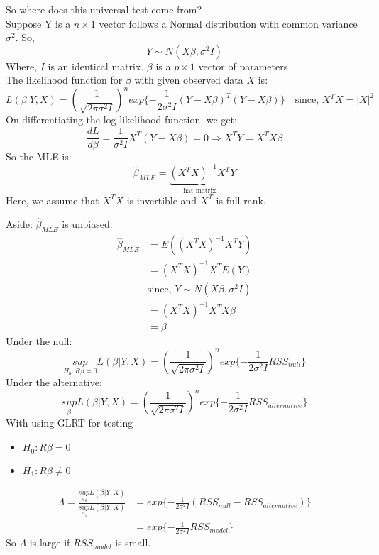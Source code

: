 \documentclass[12pt ]{article}
\begin{document}
So where does this universal test come from?\\
Suppose Y is a $n\times 1$ vector follows a Normal distribution with common variance $\sigma^2$. So,
\begin{equation*}
Y \sim N(X\beta, \sigma^2 I)
\end{equation*}
Where, $I$ is an identical matrix. $\beta$ is a $p\times 1$ vector of parameters\\
The likelihood function for $\beta$ with given observed data $X$ is:
\begin{equation*}
L(\beta|Y, X) = (\frac{1}{\sqrt{2 \pi \sigma^2 I}})^n exp\{-\frac{1}{2\sigma^2 I} (Y-X\beta)^T(Y-X\beta)\} \quad\text{since, $X^T X = |X|^2$}
\end{equation*}
On differentiating the log-likelihood function, we get:
\begin{equation*}
\frac{dL}{d\beta} = \frac{1}{\sigma^2 I} X^T(Y-X\beta) = 0 \Rightarrow X^T Y = X^T X\beta
\end{equation*}
So the MLE is:
\begin{equation*}
\hat{\beta}_{MLE} = \underbrace{(X^T X)^{-1} X^T}_{\text{hat matrix}}Y
\end{equation*}
Here, we assume that $X^TX$ is invertible and $X^T$ is full rank.\\
\color{brown}

Aside: $\hat{\beta}_{MLE}$ is unbiased.
\begin{align*}
\hat{\beta}_{MLE} &= E((X^TX)^{-1} X^TY) \\
&= (X^TX)^{-1}X^TE(Y) \\
&\text{since, $Y \sim N(X\beta, \sigma^2 I)$} \\
&=(X^TX)^{-1}X^T X\beta \\
&= \beta
\end{align*}
\color{black}
Under the null:
\begin{equation*}
\underset{H_{0}: R\beta = 0}{sup} L(\beta|Y, X) = (\frac{1}{\sqrt{2 \pi \sigma^2 I}})^n exp \{-\frac{1}{2\sigma^2 I} RSS_{null}\}
\end{equation*}
Under the alternative:
\begin{equation*}
\underset{\beta}{sup} L(\beta|Y, X) = (\frac{1}{\sqrt{2 \pi \sigma^2 I}})^n exp \{-\frac{1}{2\sigma^2 I} RSS_{alternative}\}
\end{equation*}
With using GLRT for testing
\begin{itemize}
\item $H_{0}: R\beta = 0$
\item $H_{1}: R\beta \neq 0$
\end{itemize}
\begin{align*}
\Lambda = \frac{\underset{H_{0}}{sup} L(\beta|Y, X)}{\underset{H_{1}}{sup} L(\beta|Y, X)} &= exp\{-\frac{1}{2\sigma^2 I} (RSS_{null} - RSS_{alternative})\} \\
&= exp\{-\frac{1}{2\sigma^2 I} RSS_{model}\}
\end{align*}
So $\Lambda$ is large if $RSS_{model}$ is small.\\
\end{document}
